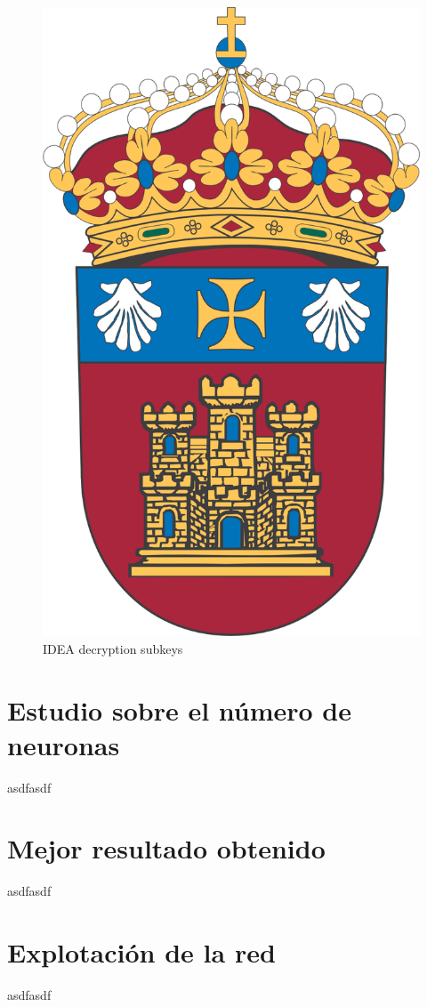 \documentclass[a4paper,12pt,titlepage]{article}
\begin{document}
\begin{figure}[!ht]
	\centering
	\label{fig:idea-enc}
	\includegraphics[width=\textwidth]{ubu-logo.png}
	\caption{IDEA decryption subkeys}
\end{figure}

\section{Estudio sobre el número de neuronas}

asdfasdf

\section{Mejor resultado obtenido}

asdfasdf

\section{Explotación de la red}

asdfasdf

\newpage


\end{document}
